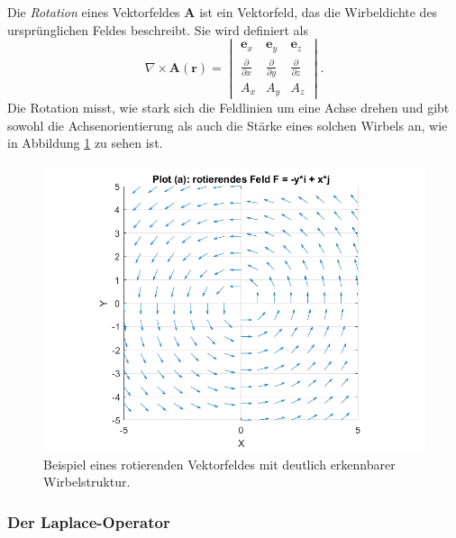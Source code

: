 Die \emph{Rotation} eines Vektorfeldes $\boldsymbol{A}$ ist ein Vektorfeld,
%
das die Wirbeldichte des ursprünglichen Feldes beschreibt.
Sie wird definiert als
\begin{equation*}
\nabla \times \boldsymbol{A}(\boldsymbol{r})
=
\begin{vmatrix}
    \boldsymbol{e}_x & \boldsymbol{e}_y & \boldsymbol{e}_z \\[2pt]
    \displaystyle\frac{\partial}{\partial x} & \displaystyle\frac{\partial}{\partial y} & \displaystyle\frac{\partial}{\partial z}\\[4pt]
    A_x & A_y & A_z
\end{vmatrix}.
\end{equation*}
Die Rotation misst, wie stark sich die Feldlinien um eine Achse
drehen und gibt sowohl die Achsenorientierung als auch die Stärke
eines solchen Wirbels an, wie in Abbildung \ref{fig:RotationAlg}
zu sehen ist.

\begin{figure}
    \centering
    \includegraphics[scale=0.4]{papers/helmholtz/images/rotierendes_Feld.png}
    \caption{Beispiel eines rotierenden Vektorfeldes mit deutlich erkennbarer Wirbelstruktur.}
    \label{fig:RotationAlg}
\end{figure}

\subsubsection{Der Laplace-Operator}

